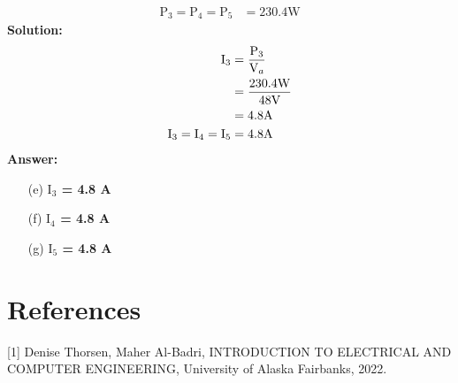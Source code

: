 \documentclass{article}
\begin{document}
\begin{itemize}
\begin{align*}
			\text{P}_3 = \text{P}_4 = \text{P}_5 &= 230.4 \text{W}
		\end{align*}
		\textbf{Solution:}
		\begin{align*}
			\text{I}_3 &= { \text{P}_3 \over \text{V}_a } \\
			&= { 230.4 \text{W} \over 48 \text{V} } \\
			&= 4.8 \text{A} \\
			\text{I}_3 = \text{I}_4 = \text{I}_5 &= 4.8 \text{A}
		\end{align*}
		\textbf{Answer:}
		\begin{itemize}
			\item[(e)] \textbf{$\text{I}_{3}$ = 4.8 A}
			\item[(f)] \textbf{$\text{I}_{4}$ = 4.8 A}
			\item[(g)] \textbf{$\text{I}_{5}$ = 4.8 A}
		\end{itemize}
\end{itemize}

\newpage
\section{References}
[1] Denise Thorsen, Maher Al-Badri, INTRODUCTION TO ELECTRICAL AND COMPUTER ENGINEERING, University of Alaska Fairbanks, 2022.
\end{document}

